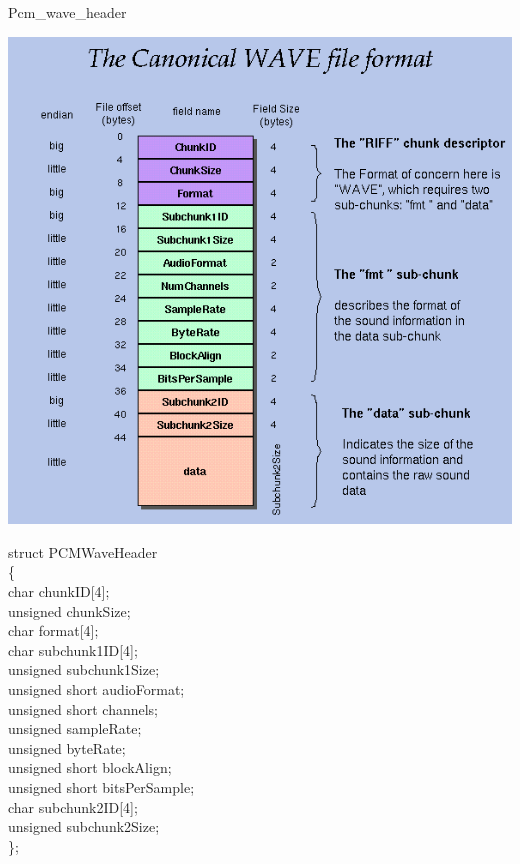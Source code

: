 \documentclass{beamer}
\begin{document}
\begin{frame}{Pcm\_wave\_header }
\begin{minipage}{0.6 \textwidth}
\includegraphics[scale=0.3]{wave.png}
\end{minipage}
\begin{minipage}{0.38 \textwidth}
struct PCMWaveHeader\\
\{\\
    char chunkID[4];\\
    unsigned chunkSize;\\
    char format[4];\\
    char subchunk1ID[4];\\
    unsigned subchunk1Size;\\
    unsigned short audioFormat;\\
    unsigned short channels;\\
    unsigned sampleRate;\\
    unsigned byteRate;\\
    unsigned short blockAlign;\\
    unsigned short bitsPerSample;\\
    char subchunk2ID[4];\\
    unsigned subchunk2Size;\\
\};\\

\end{minipage}

\end{frame}
\end{document}
